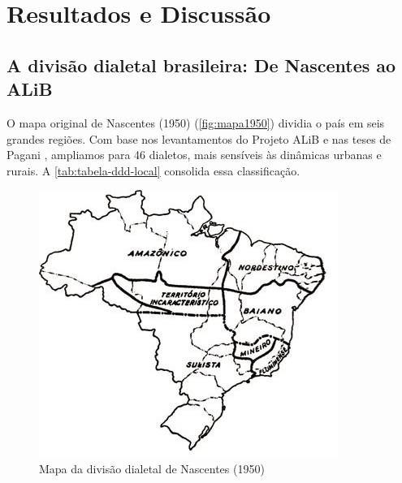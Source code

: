 \chapter{Resultados e Discussão}

\section{A divisão dialetal brasileira: De Nascentes ao ALiB}
O mapa original de Nascentes (1950) (\autoref{fig:mapa1950}) dividia o país em seis grandes regiões. Com base nos levantamentos do Projeto ALiB e nas teses de Pagani \cite{pagani2022}, ampliamos para 46 dialetos, mais sensíveis às dinâmicas urbanas e rurais. A \autoref{tab:tabela-ddd-local} consolida essa classificação.

\begin{figure}[ht]
  \centering
  \includegraphics[width=0.75\linewidth]{images/mapa_nascentes_1950.jpeg}
  \caption{Mapa da divisão dialetal de Nascentes (1950)}
  \label{fig:mapa1950}
\end{figure}






